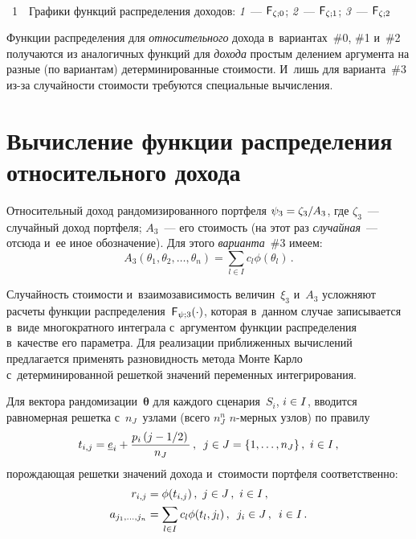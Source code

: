 \begin{multicols}{2}
 { \begin{center}  %
 \vspace*{1pt}
 \mbox{%
 \epsfxsize=77.698mm 
 }


\end{center}


\noindent
{{\figurename~1}\ \ \small{Графики функций распределения доходов:
\textit{1}~--- ${\sf F}_{\zeta;0}$; \textit{2}~--- ${\sf F}_{\zeta;1}$; \textit{3}~---
${\sf F}_{\zeta;2}$}}
}

\pagebreak


\addtocounter{figure}{1}
 
  
  Функции распределения для \textit{относительного} дохода в~вариантах~\#0, 
\#1 и~\#2 получаются из аналогичных функций для \textit{дохода} простым 
делением аргумента на разные (по вариантам) детерминированные стоимости. 
И~лишь для варианта~\#3 из-за случайности стоимости требуются специальные 
вычисления.



\section{Вычисление функции распределения 
относительного дохода} 
  
  Относительный доход рандомизированного портфеля $\psi_3\hm=\zeta_3/A_3$, 
где $\zeta_3$~--- случайный доход портфеля; $A_3$~--- его стоимость (на этот 
раз \textit{случайная}~--- отсюда и~ее иное обозначение). Для этого 
\textit{варианта}~\#3 имеем:
  $$
  A_3\left(\theta_1,\theta_2,\ldots ,\theta_n\right) =\sum\limits_{l\in I} 
c_l\phi(\theta_l)\,.
  $$
  
  Случайность стоимости и~взаимозависимость величин~$\xi_3$ и~$A_3$ 
усложняют расчеты функции распределения~${\sf F}_{\psi;3}(\cdot)$, которая 
в~данном случае записывается в~виде многократного интеграла с~аргументом 
функции распределения в~качестве его параметра. Для реализации 
приближенных вы\-чис\-ле\-ний предлагается применять разновидность метода 
Мон\-те Кар\-ло с~детерминированной решеткой значений переменных 
интегрирования. 
  
  Для вектора рандомизации~$\boldsymbol{\theta}$ для каждого 
сценария~$S_i$, $i\hm\in I$, вводится равномерная решетка с~$n_J$~узлами 
(всего $n_J^n$ $n$-мер\-ных узлов) по правилу
  $$
  t_{i,j}=\underline{e}_i+\displaystyle\frac{\displaystyle p_i\left( j-1/2\right)\mathstrut}{\displaystyle n_J\mathstrut}\,,\enskip j\in J=\{1,\ldots 
,n_J\}\,,\ i\in I\,,
  $$
порождающая решетки значений дохода и~стои\-мости портфеля соответственно:
\begin{align*}
r_{i,j}&=\phi(t_{i,j})\,,\ j\in J\,,\ i\in I\,,\\
 a_{j_1,\ldots, j_n}& =
\sum\limits_{l\in I} 
c_{l} \phi(t_{l}, j_{l})\,,\enskip 
j_i\in J\,,\enskip i\in I\,.
\end{align*}
  

\end{multicols}
